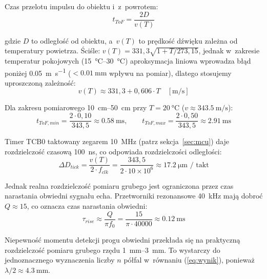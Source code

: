 \documentclass[a4paper,11pt]{article}
\begin{document}
Czas przelotu impulsu do obiektu i~z~powrotem:
\begin{equation}
    t_{ToF} = \frac{2D}{v(T)}
    \label{eq:tof}
\end{equation}

gdzie $D$ to odległość od obiektu, a~$v(T)$ to prędkość dźwięku zależna
od temperatury powietrza. Ściśle: $v(T) = 331{,}3\sqrt{1 + T/273{,}15}$,
jednak w~zakresie temperatur pokojowych (\SIrange{15}{30}{\celsius})
aproksymacja liniowa wprowadza błąd poniżej \SI{0,05}{\metre\per\second}
($< \SI{0,01}{\milli\metre}$ wpływu na pomiar), dlatego stosujemy
uproszczoną zależność:
\begin{equation}
    v(T) \approx 331{,}3 + 0{,}606 \cdot T \quad [\si{\metre\per\second}]
    \label{eq:predkosc_dzwieku}
\end{equation}

Dla zakresu pomiarowego \SIrange{10}{50}{\centi\metre} przy $T = \SI{20}{\celsius}$
($v \approx \SI{343,5}{\metre\per\second}$):
\begin{equation}
    t_{ToF,min} = \frac{2 \cdot 0{,}10}{343{,}5} \approx \SI{0,58}{\milli\second}, \qquad
    t_{ToF,max} = \frac{2 \cdot 0{,}50}{343{,}5} \approx \SI{2,91}{\milli\second}
    \label{eq:tof_zakres}
\end{equation}

Timer TCB0 taktowany zegarem \SI{10}{\mega\hertz} (patrz sekcja~\ref{sec:mcu})
daje rozdzielczość czasową \SI{100}{\nano\second}, co odpowiada rozdzielczości odległości:
\begin{equation}
    \Delta D_{tick} = \frac{v(T)}{2 \cdot f_{clk}} = \frac{343{,}5}{2 \cdot 10 \times 10^6} \approx \SI{17,2}{\micro\metre} \text{ / takt}
    \label{eq:rozdzielczosc_tick}
\end{equation}

Jednak realna rozdzielczość pomiaru grubego jest ograniczona przez czas narastania
obwiedni sygnału echa. Przetworniki rezonansowe \SI{40}{\kilo\hertz} mają
dobroć $Q \approx 15$, co oznacza czas narastania obwiedni:
\begin{equation}
    \tau_{rise} \approx \frac{Q}{\pi f_0} = \frac{15}{\pi \cdot 40000} \approx \SI{0,12}{\milli\second}
    \label{eq:tau_rise}
\end{equation}

Niepewność momentu detekcji progu obwiedni przekłada się na praktyczną
rozdzielczość pomiaru grubego rzędu \SIrange{1}{3}{\milli\metre}. To wystarczy
do jednoznacznego wyznaczenia liczby $n$ półfal w~równaniu (\ref{eq:wynik}),
ponieważ $\lambda/2 \approx \SI{4,3}{\milli\metre}$.
\end{document}
